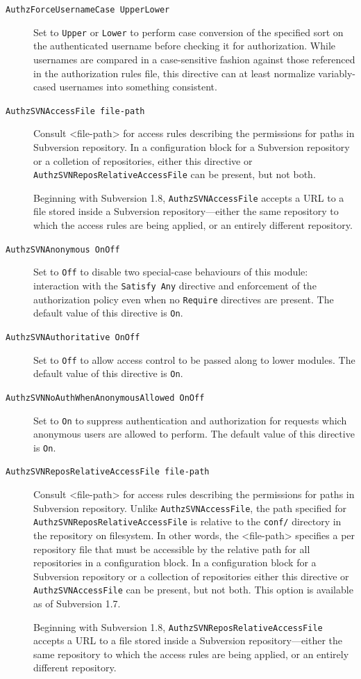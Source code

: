 \begin{description}
\item[\texttt{AuthzForceUsernameCase\ Upper\textbar{}Lower}]
Set to \texttt{Upper} or \texttt{Lower} to perform case conversion of
the specified sort on the authenticated username before checking it for
authorization. While usernames are compared in a case-sensitive fashion
against those referenced in the authorization rules file, this directive
can at least normalize variably-cased usernames into something
consistent.
\item[\texttt{AuthzSVNAccessFile\ file-path}]
Consult \textless file-path\textgreater{} for access rules describing
the permissions for paths in Subversion repository. In a configuration
block for a Subversion repository or a colletion of repositories, either
this directive or \texttt{AuthzSVNReposRelativeAccessFile} can be
present, but not both.

Beginning with Subversion 1.8, \texttt{AuthzSVNAccessFile} accepts a URL
to a file stored inside a Subversion repository---either the same
repository to which the access rules are being applied, or an entirely
different repository.
\item[\texttt{AuthzSVNAnonymous\ On\textbar{}Off}]
Set to \texttt{Off} to disable two special-case behaviours of this
module: interaction with the \texttt{Satisfy\ Any} directive and
enforcement of the authorization policy even when no \texttt{Require}
directives are present. The default value of this directive is
\texttt{On}.
\item[\texttt{AuthzSVNAuthoritative\ On\textbar{}Off}]
Set to \texttt{Off} to allow access control to be passed along to lower
modules. The default value of this directive is \texttt{On}.
\item[\texttt{AuthzSVNNoAuthWhenAnonymousAllowed\ On\textbar{}Off}]
Set to \texttt{On} to suppress authentication and authorization for
requests which anonymous users are allowed to perform. The default value
of this directive is \texttt{On}.
\item[\texttt{AuthzSVNReposRelativeAccessFile\ file-path}]
Consult \textless file-path\textgreater{} for access rules describing
the permissions for paths in Subversion repository. Unlike
\texttt{AuthzSVNAccessFile}, the path specified for
\texttt{AuthzSVNReposRelativeAccessFile} is relative to the
\texttt{conf/} directory in the repository on filesystem. In other
words, the \textless file-path\textgreater{} specifies a per repository
file that must be accessible by the relative path for all repositories
in a configuration block. In a configuration block for a Subversion
repository or a collection of repositories either this directive or
\texttt{AuthzSVNAccessFile} can be present, but not both. This option is
available as of Subversion 1.7.

Beginning with Subversion 1.8, \texttt{AuthzSVNReposRelativeAccessFile}
accepts a URL to a file stored inside a Subversion repository---either
the same repository to which the access rules are being applied, or an
entirely different repository.
\end{description}

